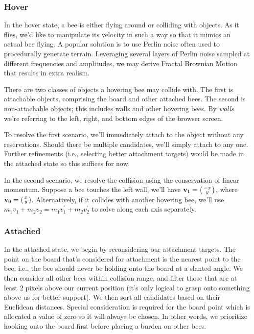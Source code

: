 \documentclass[a4paper,11pt]{article}
\begin{document}
\subsubsection{Hover}
In the hover state, a bee is either flying around or colliding with objects.
As it flies, we'd like to manipulate its velocity in such a way so that it
mimics an actual bee flying. A popular solution is to use Perlin noise
\cite{perlin2002improving} often used to procedurally generate terrain.
Leveraging several layers of Perlin noise sampled at different frequencies
and amplitudes, we may derive Fractal Brownian Motion that results in
extra realism.

There are two classes of objects a hovering bee may collide with. The first is
attachable objects, comprising the board and other attached bees. The second is
non-attachable objects; this includes walls and other hovering bees. By \textit{walls}
we're referring to the left, right, and bottom edges of the browser screen.

To resolve the first scenario, we'll immediately attach to the object without any
reservations. Should there be multiple candidates, we'll simply attach to any one.
Further refinements (i.e., selecting better attachment targets) would be made in
the attached state so this suffices for now.

In the second scenario, we resolve the collision using the conservation of linear momentum.
Suppose a bee touches the left wall, we'll have $\mathbf{v}_{1} = \begin{psmallmatrix} -x \\ y \end{psmallmatrix}$,
where $\mathbf{v}_{0} = \begin{psmallmatrix} x \\ y \end{psmallmatrix}$. Alternatively, if
it collides with another hovering bee, we'll use $m_{1}v_{1} + m_{2}v_{2} = m_{1}v_{1}^{\prime} + m_{2}v_{2}^{\prime}$
to solve along each axis separately.

\subsubsection{Attached}

In the attached state, we begin by reconsidering our attachment targets. The point on the board
that's considered for attachment is the nearest point to the bee, i.e., the bee should never
be holding onto the board at a slanted angle. We then consider all other bees within collision
range, and filter those that are at least $2$ pixels above our current position (it's only logical
to grasp onto something above us for better support). We then sort all candidates based on
their Euclidean distances. Special consideration is required for the board point which is allocated
a value of zero so it will always be chosen. In other words, we prioritize hooking onto the board first
before placing a burden on other bees.
\end{document}
